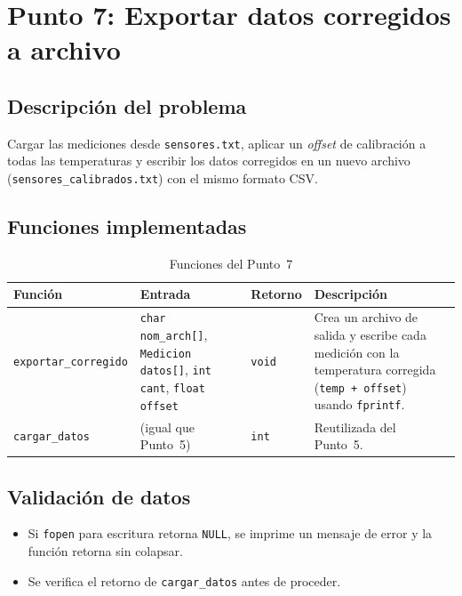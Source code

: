 \documentclass[12pt, letterpaper]{article}
\begin{document}
\section{Punto 7: Exportar datos corregidos a archivo}

\subsection{Descripción del problema}

Cargar las mediciones desde \texttt{sensores.txt}, aplicar un \textit{offset}
de calibración a todas las temperaturas y escribir los datos corregidos en un
nuevo archivo (\texttt{sensores\_calibrados.txt}) con el mismo formato CSV.

\subsection{Funciones implementadas}

\begin{table}[H]
\centering
\begin{tabular}{|l|p{3.5cm}|l|p{5cm}|}
\hline
\textbf{Función} & \textbf{Entrada} & \textbf{Retorno} & \textbf{Descripción} \\
\hline
\texttt{exportar\_corregido} &
\texttt{char nom\_arch[]},
\texttt{Medicion datos[]},
\texttt{int cant},
\texttt{float offset} &
\texttt{void} &
Crea un archivo de salida y escribe cada medición con la temperatura
corregida (\texttt{temp + offset}) usando \texttt{fprintf}. \\
\hline
\texttt{cargar\_datos} &
(igual que Punto~5) &
\texttt{int} &
Reutilizada del Punto~5. \\
\hline
\end{tabular}
\caption{Funciones del Punto~7}
\end{table}

\subsection{Validación de datos}

\begin{itemize}
    \item Si \texttt{fopen} para escritura retorna \texttt{NULL}, se imprime
          un mensaje de error y la función retorna sin colapsar.
    \item Se verifica el retorno de \texttt{cargar\_datos} antes de proceder.
\end{itemize}
\end{document}
